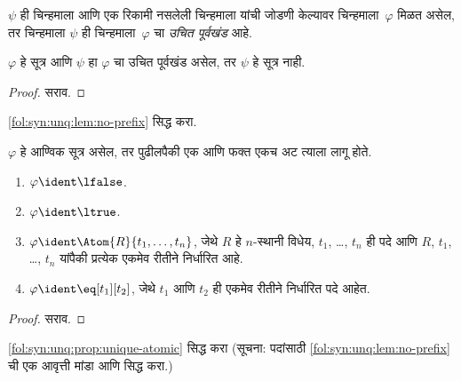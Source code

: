 \begin{defn}[उचित पूर्वखंड]
$\psi$ ही चिन्हमाला आणि एक रिकामी नसलेली चिन्हमाला यांची जोडणी केल्यावर
चिन्हमाला~$\varphi$ मिळत असेल, तर चिन्हमाला $\psi$ ही चिन्हमाला~$\varphi$ चा
\emph{उचित पूर्वखंड} आहे.
\end{defn}

\begin{lem}\label{fol:syn:unq:lem:no-prefix}
$\varphi$ हे सूत्र आणि $\psi$ हा $\varphi$ चा उचित पूर्वखंड असेल, तर $\psi$
हे सूत्र नाही.
\end{lem}

\begin{proof}
सराव.
\end{proof}

\begin{prob}
\ref{fol:syn:unq:lem:no-prefix} सिद्ध करा.
\end{prob}

\begin{prop}
\label{fol:syn:unq:prop:unique-atomic}
$\varphi$ हे आण्विक सूत्र असेल, तर पुढीलपैकी एक आणि फक्त एकच अट त्याला
लागू होते.
\begin{enumerate}
\item $\varphi \ident \lfalse$.
\item $\varphi \ident \ltrue$.
\item $\varphi \ident \Atom{R}{t_1,\dots,t_n}$, जेथे $R$ हे $n$-स्थानी
  विधेय, $t_1$, \dots, $t_n$ ही पदे आणि $R$, $t_1$, \dots,
  $t_n$ यांपैकी प्रत्येक एकमेव रीतीने निर्धारित आहे.
\item $\varphi \ident \eq[t_1][t_2]$, जेथे $t_1$ आणि $t_2$ ही एकमेव रीतीने
  निर्धारित पदे आहेत.
\end{enumerate}
\end{prop}

\begin{proof}
सराव.
\end{proof}

\begin{prob}
\ref{fol:syn:unq:prop:unique-atomic} सिद्ध करा (सूचना: पदांसाठी
\ref{fol:syn:unq:lem:no-prefix} ची एक आवृत्ती मांडा आणि सिद्ध करा.)
\end{prob}

